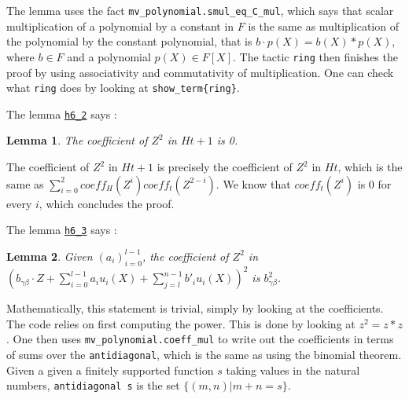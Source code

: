 \documentclass{article}
\newtheorem{lemma}{Lemma}
\theoremstyle{definition}
\theoremstyle{remark}
\begin{document}
The lemma uses the fact \texttt{mv\_polynomial.smul\_eq\_C\_mul}, which says that scalar multiplication of a polynomial by a constant in $F$ is the same as multiplication of 
the polynomial by the constant polynomial, that is $b \cdot p(X) = b(X) * p(X)$, where $b \in F$ and a polynomial $p(X) \in F[X]$. The tactic \texttt{ring} then finishes the proof 
by using associativity and commutativity of multiplication. One can check what \texttt{ring} does by looking at \texttt{show\_term\{ring\}}.

The lemma \href{https://github.com/BoltonBailey/formal-snarks-project/blob/7fd9cd122f5887f88f6a706b4f2a68a7153c7381/src/snarks/babysnark/knowledge_soundness.lean#L279}{\texttt{h6\_2}} says : 
\theoremstyle{lemma}
\begin{lemma}
  The coefficient of $Z^2$ in $H t + 1$ is 0.
\end{lemma}

The coefficient of $Z^2$ in $H t + 1$ is precisely the coefficient of $Z^2$ in $H t$, which is the same as $\sum_{i= 0}^2 coeff_{H}(Z^i) coeff_{t}(Z^{2 - i})$.
We know that $coeff_{t}(Z^i)$ is 0 for every $i$, which concludes the proof.

The lemma \href{https://github.com/BoltonBailey/formal-snarks-project/blob/7fd9cd122f5887f88f6a706b4f2a68a7153c7381/src/snarks/babysnark/knowledge_soundness.lean#L311}{\texttt{h6\_3}} says : 
\theoremstyle{lemma}
\begin{lemma}
  Given $(a_i)_{i = 0}^{l - 1}$, the coefficient of $Z^2$ in $(b_{\gamma \beta} \cdot Z + \sum_{i = 0}^{l - 1} a_i u_i (X) + \sum_{j = l}^{n - 1} b'_i u_i (X))^2$ is $b_{\gamma \beta}^2$.
\end{lemma}

Mathematically, this statement is trivial, simply by looking at the coefficients. The code relies on first computing the power. This is done by looking at $z^2 = z * z$. One then uses 
\texttt{mv\_polynomial.coeff\_mul} to write out the coefficients in terms of sums over the \texttt{antidiagonal}, which is the same as using the binomial theorem. Given a given a 
finitely supported function $s$ taking values in the natural numbers, \texttt{antidiagonal s} is the set $\{ (m, n) | m + n = s \}$. 



\end{document}
